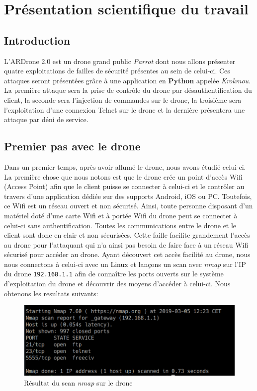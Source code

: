 \section{Présentation scientifique du travail}
\subsection{Introduction}
L'ARDrone 2.0 est un drone grand public \textit{Parrot} dont nous allons présenter quatre exploitations de failles de sécurité présentes au sein de celui-ci. Ces attaques seront présentées grâce à une application en \textbf{Python} appelée \textit{Krokmou}. La première attaque sera la prise de contrôle du drone par désauthentification du client, la seconde sera l'injection de commandes sur le drone, la troisième sera l'exploitation d'une connexion Telnet sur le drone et la dernière présentera une attaque par déni de service.

\subsection{Premier pas avec le drone}
Dans un premier temps, après avoir allumé le drone, nous avons étudié celui-ci. La première chose que nous notons est que le drone crée un point d'accès Wifi (Access Point) afin que le client puisse se connecter à celui-ci et le contrôler au travers d'une application dédiée sur des supports Android, iOS ou PC. Toutefois, ce Wifi est un réseau ouvert et non sécurisé. Ainsi, toute personne disposant d'un matériel doté d'une carte Wifi et à portée Wifi du drone peut se connecter à celui-ci sans authentification. Toutes les communications entre le drone et le client sont donc en clair et non sécurisées. Cette faille facilite grandement l'accès au drone pour l'attaquant qui n'a ainsi pas besoin de faire face à un réseau Wifi sécurisé pour accéder au drone. Ayant découvert cet accès facilité au drone, nous nous connectons à celui-ci avec un Linux et lançons un scan avec \textit{nmap} sur l'IP du drone \verb!192.168.1.1! afin de connaître les ports ouverts sur le système d'exploitation du drone et découvrir des moyens d'accéder à celui-ci. Nous obtenons les resultats suivants:

\begin{figure}[H]
  \centering
  \includegraphics[scale=0.5]{images/nmap.png}
  \caption{Résultat du scan \textit{nmap} sur le drone}
\end{figure}

